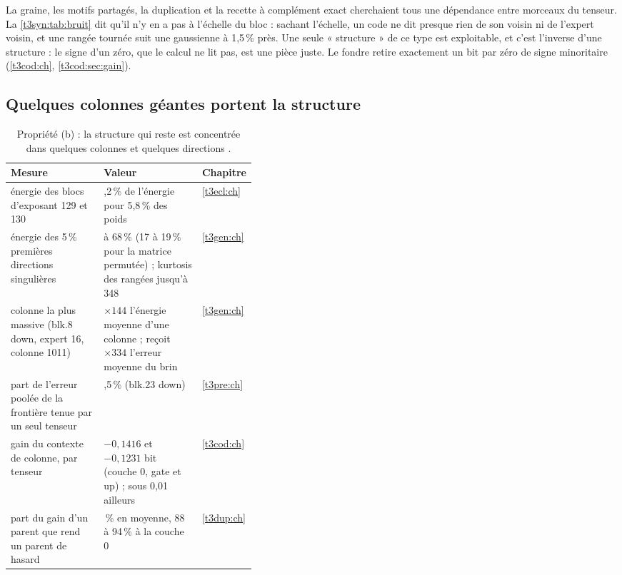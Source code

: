 La graine, les motifs partagés, la duplication et la recette à complément exact cherchaient tous une dépendance entre morceaux du tenseur. La \cref{t3syn:tab:bruit} dit qu'il n'y en a pas à l'échelle du bloc : sachant l'échelle, un code ne dit presque rien de son voisin ni de l'expert voisin, et une rangée tournée suit une gaussienne à 1,5\,\% près. Une seule « structure » de ce type est exploitable, et c'est l'inverse d'une structure : le signe d'un zéro, que le calcul ne lit pas, est une pièce juste. Le fondre retire exactement un bit par zéro de signe minoritaire (\cref{t3cod:ch}, \cref{t3cod:sec:gain}).

\subsection{Quelques colonnes géantes portent la structure}\label{t3syn:sec:colonnes}

\begin{table}[ht]
\centering\small
\caption[Propriété (b) : les colonnes géantes]{Propriété (b) : la structure qui reste est concentrée dans quelques colonnes et quelques directions \mes.}
\label{t3syn:tab:colonnes}
\begin{tabularx}{\linewidth}{@{}>{\raggedright\arraybackslash}X>{\raggedright\arraybackslash}p{0.40\linewidth}l@{}}
\toprule
Mesure & Valeur & Chapitre \\
\midrule
énergie des blocs d'exposant 129 et 130 & 74,2\,\% de l'énergie pour 5,8\,\% des poids & \cref{t3ecl:ch} \\
énergie des 5\,\% premières directions singulières & 23 à 68\,\% (17 à 19\,\% pour la matrice permutée) ; kurtosis des rangées jusqu'à 348 & \cref{t3gen:ch} \\
colonne la plus massive (blk.8 down, expert 16, colonne 1011) & $\times 144$ l'énergie moyenne d'une colonne ; reçoit $\times 334$ l'erreur moyenne du brin & \cref{t3gen:ch} \\
part de l'erreur poolée de la frontière tenue par un seul tenseur & 91,5\,\% (blk.23 down) & \cref{t3pre:ch} \\
gain du contexte de colonne, par tenseur & $-0{,}1416$ et $-0{,}1231$ bit (couche 0, gate et up) ; sous 0,01 ailleurs & \cref{t3cod:ch} \\
part du gain d'un parent que rend un parent de hasard & 46\,\% en moyenne, 88 à 94\,\% à la couche 0 & \cref{t3dup:ch} \\
\bottomrule
\end{tabularx}
\end{table}

